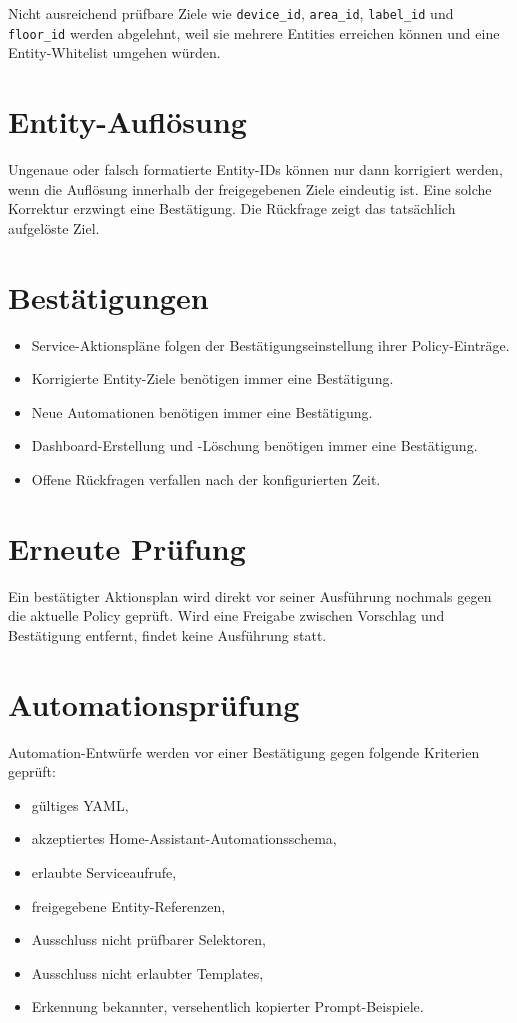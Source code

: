 \documentclass[
  11pt,
  a4paper,
  oneside,
  parskip=half
]{scrreprt}
\newcommand{\code}[1]{\texttt{#1}}
\begin{document}
Nicht ausreichend prüfbare Ziele wie \code{device\_id}, \code{area\_id},
\code{label\_id} und \code{floor\_id} werden abgelehnt, weil sie mehrere Entities
erreichen können und eine Entity-Whitelist umgehen würden.

\section{Entity-Auflösung}

Ungenaue oder falsch formatierte Entity-IDs können nur dann korrigiert werden, wenn die
Auflösung innerhalb der freigegebenen Ziele eindeutig ist. Eine solche Korrektur
erzwingt eine Bestätigung. Die Rückfrage zeigt das tatsächlich aufgelöste Ziel.

\section{Bestätigungen}

\begin{itemize}
  \item Service-Aktionspläne folgen der Bestätigungseinstellung ihrer Policy-Einträge.
  \item Korrigierte Entity-Ziele benötigen immer eine Bestätigung.
  \item Neue Automationen benötigen immer eine Bestätigung.
  \item Dashboard-Erstellung und -Löschung benötigen immer eine Bestätigung.
  \item Offene Rückfragen verfallen nach der konfigurierten Zeit.
\end{itemize}

\section{Erneute Prüfung}

Ein bestätigter Aktionsplan wird direkt vor seiner Ausführung nochmals gegen die aktuelle
Policy geprüft. Wird eine Freigabe zwischen Vorschlag und Bestätigung entfernt, findet
keine Ausführung statt.

\section{Automationsprüfung}

Automation-Entwürfe werden vor einer Bestätigung gegen folgende Kriterien geprüft:

\begin{itemize}
  \item gültiges YAML,
  \item akzeptiertes Home-Assistant-Automationsschema,
  \item erlaubte Serviceaufrufe,
  \item freigegebene Entity-Referenzen,
  \item Ausschluss nicht prüfbarer Selektoren,
  \item Ausschluss nicht erlaubter Templates,
  \item Erkennung bekannter, versehentlich kopierter Prompt-Beispiele.
\end{itemize}
\end{document}
